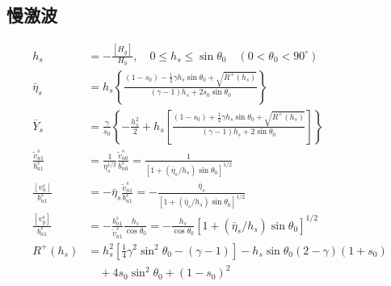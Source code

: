 \documentclass{article}
\begin{document}
\subsection{慢激波}
\begin{align}
h_s &= -\frac{[H_y]}{H_0}, \quad 0 \le h_s \le \sin\theta_0 \quad (0 < \theta_0 < 90^\circ)
\\
\bar{\eta}_s &= h_s \left\{\frac{(1-s_0) - \frac{1}{2} \gamma h_s \sin\theta_0 +
\sqrt{R^+ (h_s)}}{(\gamma-1) h_s + 2 s_0 \sin\theta_0}\right\}
\\
\bar{Y}_s &= \frac{\gamma}{s_0} \left\{-\frac{h_s^2}{2} + h_s \left[\frac{(1-s_0) +
\frac{1}{2} \gamma h_s \sin\theta_0 + \sqrt{R^+ (h_s)}}{(\gamma-1) h_s + 2
\sin\theta_0}\right]\right\}
\\
\frac{\tilde{v}_{n1}^s}{b_{n1}^s} &= \frac{1}{\eta_s^{1/2}}
\frac{\tilde{v}_{n0}^s}{b_{n0}^s} = \frac{1}{[1+(\bar{\eta}_s/h_s)\sin\theta_0]^{1/2}}
\\
\frac{[v_n^s]}{b_{n1}^s} &= - \bar{\eta}_s \frac{\tilde{v}_{n1}^s}{b_{n1}^s} =
-\frac{\bar{\eta}_s}{[1+(\bar{\eta}_s/h_s)\sin\theta_0]^{1/2}}
\\
\frac{[v_y^s]}{b_{n1}^s} &= - \frac{b_{n1}^s}{\tilde{v}_{n1}^s}
\frac{h_s}{\cos\theta_0} = -\frac{h_s}{\cos\theta_0}
[1+(\bar{\eta}_s/h_s)\sin\theta_0]^{1/2}
\\
R^+(h_s) &= h_s^2 [\frac{1}{4} \gamma^2 \sin^2\theta_0 - (\gamma-1)] - h_s \sin\theta_0
(2-\gamma)(1+s_0) \nonumber
\\
& \quad + 4s_0 \sin^2\theta_0 + (1-s_0)^2
\end{align}
\end{document}
